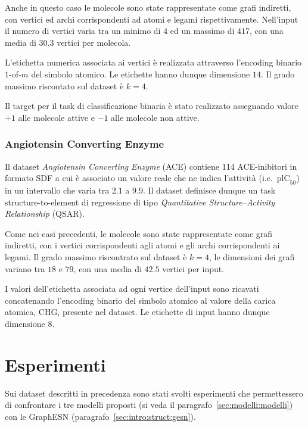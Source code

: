 Anche in questo caso le molecole sono state rappresentate come grafi indiretti, con vertici ed archi corrispondenti ad atomi e legami rispettivamente. Nell'input il numero di vertici varia tra un minimo di $4$ ed un massimo di $417$, con una media di $30.3$ vertici per molecola.

L'etichetta numerica associata ai vertici è realizzata attraverso l'encoding binario $1$-of-$m$ del simbolo atomico. Le etichette hanno dunque dimensione $14$. Il grado massimo riscontato sul dataset è $k = 4$.

Il target per il task di classificazione binaria è stato realizzato assegnando valore $+1$ alle molecole attive e $-1$ alle molecole non attive.


\subsubsection*{Angiotensin Converting Enzyme}\label{sec:esperimenti:dataset:ace}
Il dataset \emph{Angiotensin Converting Enzyme} (ACE) \cite{Sutherland:AComparisonOfMethods} contiene 114 ACE-inibitori in formato SDF a cui è associato un valore reale che ne indica l'attività (i.e.\ $\text{plC}_{50}$) in un intervallo che varia tra $2.1$ a $9.9$. Il dataset definisce dunque un task structure-to-element di regressione di tipo \emph{Quantitative Structure–Activity Relationship} (QSAR).

Come nei casi precedenti, le molecole sono state rappresentate come grafi indiretti, con i vertici corrispondenti agli atomi e gli archi corrispondenti ai legami. Il grado massimo riscontrato sul dataset è $k=4$, le dimensioni dei grafi variano tra $18$ e $79$, con una media di $42.5$ vertici per input.

I valori dell'etichetta associata ad ogni vertice dell'input sono ricavati concatenando l'encoding binario del simbolo atomico al valore della carica atomica, CHG, presente nel dataset. Le etichette di input hanno dunque dimensione $8$.



\section{Esperimenti}\label{sec:esperiment:esperimenti}
Sui dataset descritti in precedenza sono stati svolti esperimenti che permettessero di confrontare i tre modelli proposti (si veda il paragrafo~\ref{sec:modelli:modelli}) con le GraphESN (paragrafo~\ref{sec:intro:struct:gesn}). 

